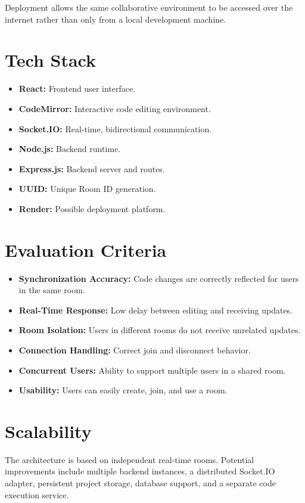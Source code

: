 \documentclass[11pt,letterpaper]{article}
\begin{document}
Deployment allows the same collaborative environment to be accessed over the internet rather than only from a local development machine.


\section{Tech Stack}
\begin{itemize}
\item \textbf{React:} Frontend user interface.
\item \textbf{CodeMirror:} Interactive code editing environment.
\item \textbf{Socket.IO:} Real-time, bidirectional communication.
\item \textbf{Node.js:} Backend runtime.
\item \textbf{Express.js:} Backend server and routes.
\item \textbf{UUID:} Unique Room ID generation.
\item \textbf{Render:} Possible deployment platform.
\end{itemize}

\newpage
\section{Evaluation Criteria}
\begin{itemize}
\item \textbf{Synchronization Accuracy:} Code changes are correctly reflected for users in the same room.
\item \textbf{Real-Time Response:} Low delay between editing and receiving updates.
\item \textbf{Room Isolation:} Users in different rooms do not receive unrelated updates.
\item \textbf{Connection Handling:} Correct join and disconnect behavior.
\item \textbf{Concurrent Users:} Ability to support multiple users in a shared room.
\item \textbf{Usability:} Users can easily create, join, and use a room.
\end{itemize}

\section{Scalability}
The architecture is based on independent real-time rooms. Potential improvements include multiple backend instances, a distributed Socket.IO adapter, persistent project storage, database support, and a separate code execution service.
\end{document}
